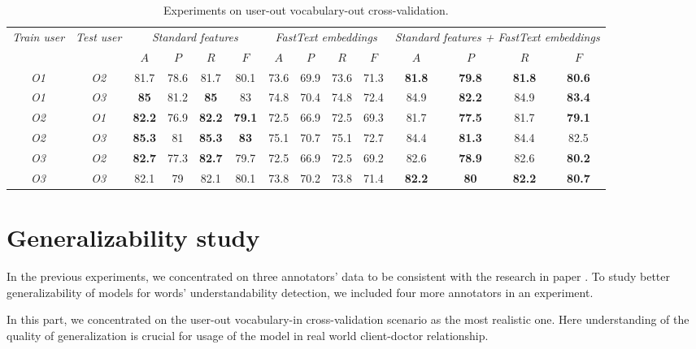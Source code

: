 \begin{table}[h]
\begin{tabular}{cc|cccc|cccc|cccc}
\multirow{2}{0.6cm}{\textit{Train user}} & \multirow{2}{0.6cm}{\textit{Test user}} & \multicolumn{4}{c|}{\textit{Standard features}} & \multicolumn{4}{c|}{\textit{FastText embeddings}} & \multicolumn{4}{X}{\textit{Standard features + FastText embeddings}} \\ \cline{3-14} 
 &  & $A$ & $P$ & $R$ & $F$ & $A$ & $P$ & $R$ & $F$ & $A$ & $P$ & $R$ & $F$ \\ \hline
\textit{O1} & \textit{O2} & 81.7 & 78.6 & 81.7 & 80.1 & 73.6 & 69.9 & 73.6 & 71.3 & \textbf{81.8} & \textbf{79.8} & \textbf{81.8} & \textbf{80.6} \\ 
\textit{O1} & \textit{O3} & \textbf{85} & 81.2 & \textbf{85} & 83 & 74.8 & 70.4 & 74.8 & 72.4 & 84.9 & \textbf{82.2} & 84.9 & \textbf{83.4} \\ \hline 
\textit{O2} & \textit{O1} & \textbf{82.2} & 76.9 & \textbf{82.2} & \textbf{79.1} & 72.5 & 66.9 & 72.5 & 69.3 & 81.7 & \textbf{77.5} & 81.7 & \textbf{79.1} \\
\textit{O2} & \textit{O3} & \textbf{85.3} & 81 & \textbf{85.3} & \textbf{83} & 75.1 & 70.7 & 75.1 & 72.7 & 84.4 & \textbf{81.3} & 84.4 & 82.5 \\ \hline 
\textit{O3} & \textit{O2} & \textbf{82.7} & 77.3 & \textbf{82.7} & 79.7 & 72.5 & 66.9 & 72.5 & 69.2 & 82.6 & \textbf{78.9} & 82.6 & \textbf{80.2} \\ 
\textit{O3} & \textit{O3} & 82.1 & 79 & 82.1 & 80.1 & 73.8 & 70.2 & 73.8 & 71.4 & \textbf{82.2} & \textbf{80} & \textbf{82.2} & \textbf{80.7} \\ \hline 
\end{tabular}
    \caption{Experiments on user-out vocabulary-out cross-validation.}
    \label{tab:user-out-voc-out}
\end{table}

\section{Generalizability study}
\label{sec:generalizability-study}
In the previous experiments, we concentrated on three annotators' data to be consistent with the research in paper \citep{Grabar-PITR2014}. To study better generalizability of models for words' understandability detection, we included four more annotators in an experiment.

In this part, we concentrated on the user-out vocabulary-in cross-validation scenario as the most realistic one. Here understanding of the quality of generalization is crucial for usage of the model in real world client-doctor relationship.

